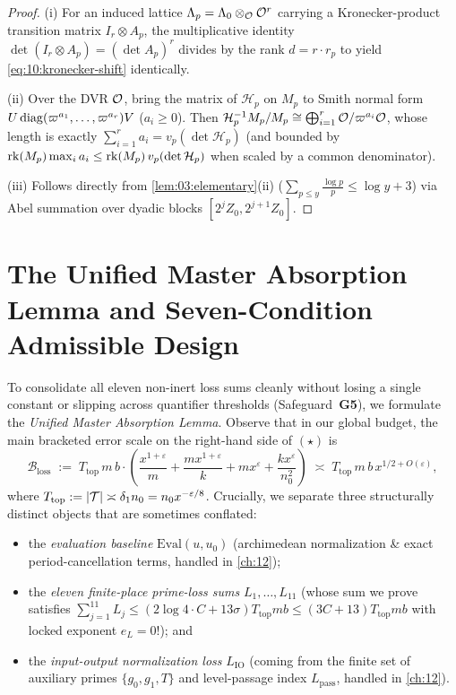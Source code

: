 \begin{proof}
(i) For an induced lattice $\Lambda_p = \Lambda_0 \otimes_{\mathcal{O}} \mathcal{O}^{r}$ carrying a Kronecker-product transition matrix $I_r \otimes A_p$, the multiplicative identity $\det(I_r \otimes A_p) = (\det A_p)^r$ divides by the rank $d = r \cdot r_p$ to yield \eqref{eq:10:kronecker-shift} identically.

(ii) Over the DVR $\mathcal{O}$, bring the matrix of $\mathcal{H}_p$ on $M_p$ to Smith normal form $U\operatorname{diag}(\varpi^{a_1}, \dots, \varpi^{a_r}) V$ ($a_i \ge 0$). Then $\mathcal{H}_p^{-1} M_p / M_p \cong \bigoplus_{i=1}^r \mathcal{O} / \varpi^{a_i}\mathcal{O}$, whose length is exactly $\sum_{i=1}^r a_i = v_p(\det \mathcal{H}_p)$ (and bounded by $\operatorname{rk}(M_p) \max_i a_i \le \operatorname{rk}(M_p)\, v_p(\det \mathcal{H}_p)$ when scaled by a common denominator).

(iii) Follows directly from \cref{lem:03:elementary}(ii) ($\sum_{p \le y} \frac{\log p}{p} \le \log y + 3$) via Abel summation over dyadic blocks $[2^j Z_0, 2^{j+1} Z_0]$.
\end{proof}

\section{The Unified Master Absorption Lemma and Seven-Condition Admissible Design}
\label{sec:10:master-absorption}

To consolidate all eleven non-inert loss sums cleanly without losing a single constant or slipping across quantifier thresholds (Safeguard~\textbf{G5}), we formulate the \emph{Unified Master Absorption Lemma}. Observe that in our global budget, the main bracketed error scale on the right-hand side of $(\star)$ is
\[
  \mathcal{B}_{\mathrm{loss}} \;:=\; T_{\mathrm{top}}\, m\, b \cdot \left(\frac{x^{1+\varepsilon}}{m} + \frac{m x^{1+\varepsilon}}{k} + m x^\varepsilon + \frac{k x^\varepsilon}{n_0^2}\right)
  \;\asymp\; T_{\mathrm{top}}\, m\, b\, x^{1/2 + O(\varepsilon)},
\]
where $T_{\mathrm{top}} := |\mathcal{T}| \asymp \delta_1 n_0 = n_0 x^{-\varepsilon/8}$. Crucially, we separate three structurally distinct objects that are sometimes conflated:
\begin{itemize}
\item the \emph{evaluation baseline} $\mathrm{Eval}(u, u_0)$ (archimedean normalization & exact period-cancellation terms, handled in \cref{ch:12});
\item the \emph{eleven finite-place prime-loss sums} $L_1, \dots, L_{11}$ (whose sum we prove satisfies $\sum_{j=1}^{11} L_j \le (2\log 4 \cdot C + 13\sigma) T_{\mathrm{top}} m b \le (3C + 13) T_{\mathrm{top}} m b$ with locked exponent $e_L = 0$!); and
\item the \emph{input-output normalization loss} $L_{\mathrm{IO}}$ (coming from the finite set of auxiliary primes $\{g_0, g_1, T\}$ and level-passage index $L_{\mathrm{pass}}$, handled in \cref{ch:12}).
\end{itemize}


